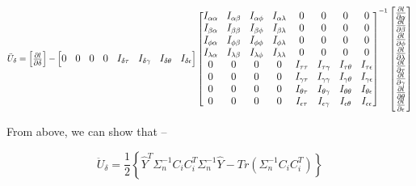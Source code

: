 \documentclass[hidelinks]{article}
\begin{document}
\[
\large
\ddot{U}_{\delta} = \begin{bmatrix} \frac{\partial l }{\partial \delta}  \end{bmatrix}
 - \begin{bmatrix} 0 & 0 & 0  &  0 &   I_{\delta\tau} & I_{\delta\gamma} & I_{\delta\theta} &I_{\delta\epsilon} \end{bmatrix} 
   \begin{bmatrix} I_{\alpha\alpha} & I_{\alpha\beta} & I_{\alpha\phi} & I_{\alpha\lambda} & 0 & 0 & 0 & 0 \\ 
   			 I_{\beta\alpha} & I_{\beta\beta} & I_{\beta\phi} & I_{\beta\lambda} & 0 &  0 & 0 & 0 \\ 	
			 I_{\phi\alpha} & I_{\phi\beta} & I_{\phi\phi} & I_{\phi\lambda} & 0 &  0 & 0 & 0 \\ 	
			 I_{\lambda\alpha} & I_{\lambda\beta} & I_{\lambda\phi} & I_{\lambda\lambda} & 0 &  0 & 0 & 0 \\ 
			 0 & 0 & 0 & 0 & I_{\tau\tau} &  I_{\tau\gamma} & I_{\tau\theta} & I_{\tau\epsilon} \\ 	
			 0 & 0 & 0 & 0 & I_{\gamma\tau} &  I_{\gamma\gamma} & I_{\gamma\theta} & I_{\gamma\epsilon} \\ 
			 0 & 0 & 0 & 0 & I_{\theta\tau} &  I_{\theta\gamma} & I_{\theta\theta} & I_{\theta\epsilon} \\ 
			 0 & 0 & 0 & 0 & I_{\epsilon\tau} & I_{\epsilon\gamma} & I_{\epsilon\theta} & I_{\epsilon\epsilon} \end{bmatrix}^{-1} 			 			 
\begin{bmatrix} \frac{\partial l}{\partial \alpha}  \\   \frac{\partial l}{\partial \beta}  \\  \frac{\partial l}{\partial \phi}  \\ \frac{\partial l}{\partial \lambda}  \\ \frac{\partial l}{\partial \tau}  \\    \frac{\partial l}{\partial \gamma}  \\ \frac{\partial l}{\partial \theta}  \\ \frac{\partial l}{\partial \epsilon} \end{bmatrix}
\]

From above, we can show that --

\begin{equation*}
\ddot{U}_\delta = \frac{1}{2} \left\{\hat{Y}^T \Sigma_n^{-1} C_iC_i^T \Sigma_n^{-1}\hat{Y}- Tr \left(\Sigma_n^{-1} C_i C_i^T\right)\right\}
\end{equation*}
\end{document}
